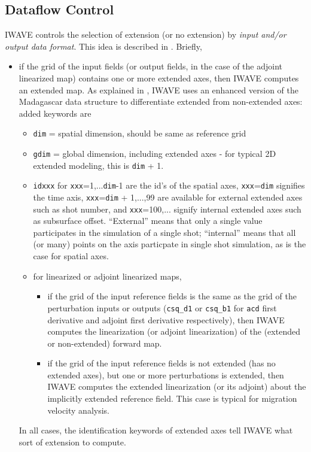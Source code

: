 \subsection{Dataflow Control}
IWAVE controls the selection of extension (or no extension) by {\em input and/or output data format}. This idea is described in \cite[]{trip14:struct}. Briefly,
\begin{itemize}
\item if the grid of the input fields (or output fields, in the case of the adjoint linearized map) contains one or more extended axes, then IWAVE computes an extended map. As explained in \cite[]{trip14:struct}, IWAVE uses an enhanced version of the Madagascar data structure to differentiate extended from non-extended axes: added keywords are
\begin{itemize}
\item {\tt dim} = spatial dimension, should be same as reference grid
\item {\tt gdim} = global dimension, including extended axes - for typical 2D extended modeling, this is {\tt dim} + 1.
\item {\tt idxxx} for {\tt xxx}=1,...{\tt dim}-1 are the id's of the spatial axes, {\tt xxx}={\tt dim} signifies the time axis, {\tt xxx}={\tt dim} + 1,...,99 are available for external extended axes such as shot number, and {\tt xxx}=100,... signify internal extended axes such as subsurface offset.  ``External'' means that only a single value participates in the simulation of a single shot; ``internal''  means that all (or many) points on the axis particpate in single shot simulation, as is the case for spatial axes.
\item for linearized or adjoint linearized maps, 
\begin{itemize}
\item if the grid of the input reference fields is the same as the grid of the perturbation inputs or outputs ({\tt csq\_d1} or {\tt csq\_b1} for {\tt acd} first derivative and adjoint first derivative respectively), then IWAVE computes the linearization (or adjoint linearization) of the (extended or non-extended) forward map.
\item if the grid of the input reference fields is not extended (has no extended axes), but one or more perturbations is extended, then IWAVE computes the extended linearization (or its adjoint) about the implicitly extended reference field. This case is typical for migration velocity analysis.
\end{itemize}

\end{itemize}
In all cases, the identification keywords of extended axes tell IWAVE what sort of extension to compute.
\end{itemize}

